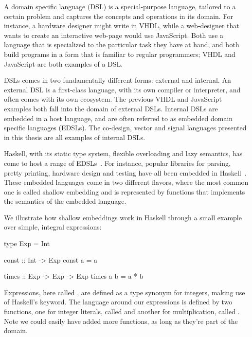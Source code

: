 \documentclass[../main.tex]{subfiles}
\begin{document}
A domain specific language (DSL) is a special-purpose language, tailored to a certain problem and captures the concepts and operations in its domain. For instance, a hardware designer might write in VHDL, while a web-designer that wants to create an interactive web-page would use JavaScript. Both use a language that is specialized to the particular task they have at hand, and both build programs in a form that is familiar to regular programmers; VHDL and JavaScript are both examples of a DSL.

DSLs comes in two fundamentally different forms: external and internal. An external DSL is a first-class language, with its own compiler or interpreter, and often comes with its own ecosystem. The previous VHDL and JavaScript examples both fall into the domain of external DSLs. Internal DSLs are embedded in a host language, and are often referred to as embedded domain specific languages (EDSLs). The co-design, vector and signal languages presented in this thesis are all examples of internal DSLs.


Haskell, with its static type system, flexible overloading and lazy semantics, has come to host a range of EDSLs~\cite{elliott2003}. For instance, popular libraries for parsing, pretty printing, hardware design and testing have all been embedded in Haskell~\cite{leijen2002, hughes1995, bjesse1998}. These embedded languages come in two different flavors, where the most common one is called shallow embedding and is represented by functions that implements the semantics of the embedded language.

We illustrate how shallow embeddings work in Haskell through a small example over simple, integral expressions:

\begin{code}
type Exp = Int

const :: Int -> Exp
const a = a

times :: Exp -> Exp -> Exp
times a b = a * b
\end{code}

\noindent Expressions, here called , are defined as a type synonym for integers, making use of Haskell's  keyword. The language around our expressions is defined by two functions, one for integer literals, called  and another for multiplication, called . Note we could easily have added more functions, as long as they're part of the domain.
\end{document}
